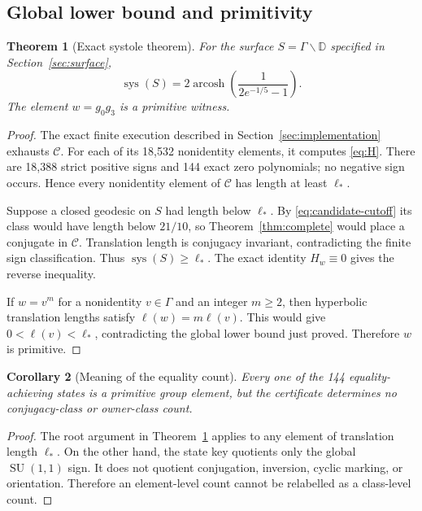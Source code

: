 \documentclass[11pt,a4paper]{article}
\newtheorem{theorem}{Theorem}[section]
\newtheorem{corollary}[theorem]{Corollary}
\theoremstyle{definition}
\newcommand{\D}{\mathbb D}
\newcommand{\SU}{\operatorname{SU}}
\newcommand{\arcosh}{\operatorname{arcosh}}
\newcommand{\sys}{\operatorname{sys}}
\newcommand{\length}{\ell}
\begin{document}
\subsection{Global lower bound and primitivity}

\begin{theorem}[Exact systole theorem]\label{thm:systole}
For the surface \(S=\Gamma\backslash\D\) specified in
Section~\ref{sec:surface},
\[
 \sys(S)=2\arcosh\!\left(\frac{1}{2e^{-1/5}-1}\right).
\]
The element \(w=g_0g_3\) is a primitive witness.
\end{theorem}

\begin{proof}
The exact finite execution described in Section~\ref{sec:implementation}
exhausts \(\mathcal C\).  For each of its 18,532 nonidentity elements, it
computes \eqref{eq:H}.  There are 18,388 strict positive signs and 144 exact
zero polynomials; no negative sign occurs.  Hence every nonidentity element
of \(\mathcal C\) has length at least \(\length_*\).

Suppose a closed geodesic on \(S\) had length below \(\length_*\).  By
\eqref{eq:candidate-cutoff} its class would have length below \(21/10\), so
Theorem~\ref{thm:complete} would place a conjugate in \(\mathcal C\).
Translation length is conjugacy invariant, contradicting the finite sign
classification.  Thus \(\sys(S)\geq\length_*\).  The exact identity
\(H_w\equiv0\) gives the reverse inequality.

If \(w=v^m\) for a nonidentity \(v\in\Gamma\) and an integer \(m\geq2\), then
hyperbolic translation lengths satisfy
\(\length(w)=m\length(v)\).  This would give
\(0<\length(v)<\length_*\), contradicting the global lower bound just proved.
Therefore \(w\) is primitive.
\end{proof}

\begin{corollary}[Meaning of the equality count]
Every one of the 144 equality-achieving states is a primitive group element,
but the certificate determines no conjugacy-class or owner-class count.
\end{corollary}

\begin{proof}
The root argument in Theorem~\ref{thm:systole} applies to any element of
translation length \(\length_*\).  On the other hand, the state key quotients
only the global \(\SU(1,1)\) sign.  It does not quotient conjugation, inversion,
cyclic marking, or orientation.  Therefore an element-level count cannot be
relabelled as a class-level count.
\end{proof}
\end{document}
